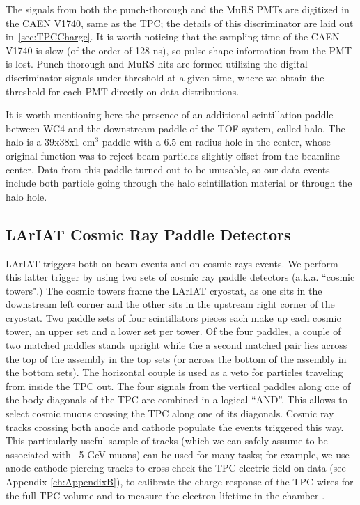The signals from both the punch-thorough and the MuRS PMTs are digitized in the CAEN V1740, same as the TPC; the details of this discriminator are laid out in~\ref{sec:TPCCharge}. It is worth noticing that the sampling time of the CAEN V1740 is slow (of the order of 128 ns), so pulse shape information from the PMT is lost.
Punch-thorough and MuRS hits are formed utilizing the digital discriminator signals under threshold at a given time, where we obtain the threshold for each PMT directly on data distributions.

It is worth mentioning here the presence of an additional scintillation paddle between WC4 and the downstream paddle of the TOF system, called halo. The halo is a 39x38x1 cm$^3$ paddle with a 6.5 cm radius hole in the center, whose original function was to reject  beam particles slightly offset from the beamline center. Data from this paddle turned out to be unusable, so our data events include both particle going through the halo scintillation material or through the halo hole.

\subsection{LArIAT Cosmic Ray Paddle Detectors}\label{sec:CosmicRayPaddle}
LArIAT triggers both on beam events and on cosmic rays events. We perform this latter trigger by using two sets of cosmic ray paddle detectors (a.k.a. ``cosmic towers".) The cosmic towers frame the LArIAT cryostat, as one sits in the downstream left corner and the other sits in the upstream right corner of the cryostat. Two paddle sets of four scintillators pieces each make up each cosmic tower, an upper set and a lower set per tower. 
Of the four paddles, a couple of two matched paddles stands upright while the a second matched pair lies across the top of the assembly in the top sets (or across the bottom of the assembly in the bottom sets). The horizontal couple is used as a veto for particles traveling from inside the TPC out.  The four signals  from the vertical paddles along one of the body diagonals of the TPC are combined in a logical ``AND''. This allows to select cosmic muons crossing the TPC along one of its diagonals.  Cosmic ray tracks crossing both anode and cathode populate the events triggered this way. This particularly useful sample of tracks (which we can safely assume to be associated with ~5 GeV muons) can be used for many tasks; for example, we use anode-cathode piercing tracks to cross check the TPC electric field on data (see Appendix \ref{ch:AppendixB}), to calibrate the charge response of the TPC wires for the full TPC volume and to measure the electron lifetime in the chamber \cite{LArIATLifeTime}.

